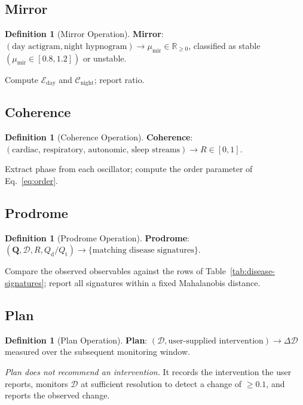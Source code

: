 \documentclass[11pt,twocolumn,a4paper]{article}
\theoremstyle{definition}
\newtheorem{definition}[theorem]{Definition}
\theoremstyle{remark}
\newcommand{\Real}{\mathbb{R}}
\newcommand{\Qt}{Q_{\mathrm{t}}}
\newcommand{\Qd}{Q_{\mathrm{d}}}
\newcommand{\Dhier}{\mathcal{D}}
\newcommand{\Rcoh}{R}
\newcommand{\munir}{\mu_{\mathrm{mir}}}
\begin{document}
\subsection{Mirror}

\begin{definition}[Mirror Operation]
\textbf{Mirror}: $(\text{day actigram}, \text{night hypnogram}) \to
\munir \in \Real_{\geq 0}$, classified as stable
$(\munir \in [0.8, 1.2])$ or unstable.

Compute $\mathcal{E}_{\mathrm{day}}$ and
$\mathcal{C}_{\mathrm{night}}$; report ratio.
\end{definition}

\subsection{Coherence}

\begin{definition}[Coherence Operation]
\textbf{Coherence}: $(\text{cardiac, respiratory, autonomic, sleep
streams}) \to \Rcoh \in [0,1]$.

Extract phase from each oscillator; compute the order parameter
of Eq.~\eqref{eq:order}.
\end{definition}

\subsection{Prodrome}

\begin{definition}[Prodrome Operation]
\textbf{Prodrome}: $(\mathbf{Q}, \Dhier, \Rcoh, \Qd/\Qt) \to
\{\text{matching disease signatures}\}$.

Compare the observed observables against the rows of
Table~\ref{tab:disease-signatures}; report all signatures within a
fixed Mahalanobis distance.
\end{definition}

\subsection{Plan}

\begin{definition}[Plan Operation]
\textbf{Plan}: $(\Dhier, \text{user-supplied intervention}) \to
\Delta \Dhier$ measured over the subsequent monitoring window.

\emph{Plan does not recommend an intervention.} It records the
intervention the user reports, monitors $\Dhier$ at sufficient
resolution to detect a change of $\geq 0.1$, and reports the
observed change.
\end{definition}
\end{document}
